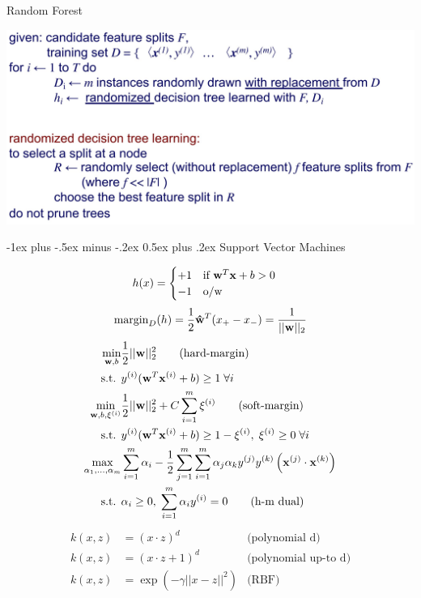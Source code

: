 \documentclass[10pt,landscape]{article}
\makeatletter
\renewcommand{\section}{\@startsection{section}{1}{0mm}%
{-1ex plus -.5ex minus -.2ex}%
{0.5ex plus .2ex}%
{\normalfont\large\bfseries}}
\makeatother
\begin{document}
\begin{multicols}{4}
    Random Forest

    \includegraphics[width=0.9\linewidth]{snips/24_random-forest.jpg}   
    
    
    \section{Support Vector Machines}
    
    \begin{equation*}
    h(x) = \begin{cases} +1 \quad \text{if } \bold{w}^T \bold{x} + b > 0 \\ -1 \quad \text{o/w} \end{cases}
    \end{equation*}
    \begin{equation*}
        \text{margin}_D (h) = \frac{1}{2} \bold{\hat{w}}^T (x_+ - x_-) = \frac{1}{||\bold{w}||_2}
    \end{equation*}
    \begin{align*}
        \min_{\bold{w},b}& \frac{1}{2} || \bold{w}||_2^2
        \qquad \text{(hard-margin)}
        \\
        \text{ s.t. }& y^{(i)} (\bold{w}^T \bold{x}^{(i)} + b) \geq 1 \; \forall i
        \\
        \min_{\bold{w},b,\xi^{(i)}}& \frac{1}{2} || \bold{w}||_2^2 + C \sum_{i=1}^m \xi^{(i)}
        \qquad \text{(soft-margin)}
        \\
        \text{ s.t. }& y^{(i)} (\bold{w}^T \bold{x}^{(i)} + b) \geq 1-\xi^{(i)}, \; \xi^{(i)} \geq 0 \; \forall i
        \\
        \max_{\alpha_1,\dots, \alpha_m}& \sum_{i=1}^m \alpha_i - \frac{1}{2} \sum_{j=1}^m \sum_{i=1}^m \alpha_j \alpha_k y^{(j)} y^{(k)} \left(\bold{x}^{(j)} \cdot \bold{x}^{(k)} \right)
        \\
        \text{ s.t. }& \alpha_i \geq 0,\; \sum_{i=1}^m \alpha_i y^{(i)} = 0
        \qquad \text{(h-m dual)}
    \end{align*}
    \begin{align*}
        k(x,z) &= (x \cdot z)^d
        & \text{(polynomial d)}
        \\
        k(x,z) &= (x \cdot z + 1)^d
        & \text{(polynomial up-to d)}
        \\
        k(x,z) &= \exp \left( -\gamma ||x-z||^2 \right)        
        & \text{(RBF)}
    \end{align*}    
    

\end{multicols}
\end{document}
